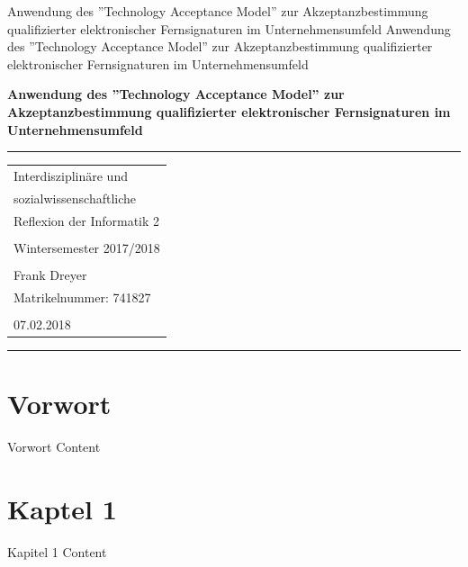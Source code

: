 \documentclass[deutsch]{lib/llncs/llncs}
\begin{document}
\markboth
{Anwendung des ''Technology Acceptance Model'' zur Akzeptanzbestimmung qualifizierter elektronischer  Fernsignaturen im Unternehmensumfeld}
{Anwendung des ''Technology Acceptance Model'' zur Akzeptanzbestimmung qualifizierter elektronischer  Fernsignaturen im Unternehmensumfeld}
\thispagestyle{empty}


\begin{flushleft}
\LARGE\bfseries Anwendung des ''Technology Acceptance Model'' zur Akzeptanzbestimmung qualifizierter elektronischer  Fernsignaturen im Unternehmensumfeld


\end{flushleft}
\rule{\textwidth}{1pt}
\vspace{2pt}


\begin{flushright}
\Huge


\begin{tabular}{@{}l}
Interdisziplinäre und \\
sozialwissenschaftliche \\
Reflexion der Informatik 2\\\\
Wintersemester 2017/2018\\\\
Frank Dreyer\\
Matrikelnummer: 741827\\\\
07.02.2018\\[6pt]
\end{tabular}


\end{flushright}
\rule{\textwidth}{1pt}
\vfill

\newpage
\tableofcontents
\newpage


\section{Vorwort}
Vorwort Content


\section{Kaptel 1}
Kapitel 1 Content
\end{document}
